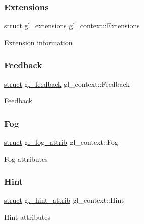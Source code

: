 \subsubsection{\texorpdfstring{Extensions}{Extensions}}
{\footnotesize\ttfamily \hyperlink{interfacestruct}{struct} \hyperlink{structgl__extensions}{gl\+\_\+extensions} gl\+\_\+context\+::\+Extensions}

Extension information \mbox{\label{structgl__context_a95b4746db6881392cca9b3580c0e21a9}} 
\subsubsection{\texorpdfstring{Feedback}{Feedback}}
{\footnotesize\ttfamily \hyperlink{interfacestruct}{struct} \hyperlink{structgl__feedback}{gl\+\_\+feedback} gl\+\_\+context\+::\+Feedback}

Feedback \mbox{\label{structgl__context_af8949f54ba019939b7eebc1200aaec78}} 
\subsubsection{\texorpdfstring{Fog}{Fog}}
{\footnotesize\ttfamily \hyperlink{interfacestruct}{struct} \hyperlink{structgl__fog__attrib}{gl\+\_\+fog\+\_\+attrib} gl\+\_\+context\+::\+Fog}

Fog attributes \mbox{\label{structgl__context_a7ac77ff692912136a0fb6703e1bb863c}} 
\subsubsection{\texorpdfstring{Hint}{Hint}}
{\footnotesize\ttfamily \hyperlink{interfacestruct}{struct} \hyperlink{structgl__hint__attrib}{gl\+\_\+hint\+\_\+attrib} gl\+\_\+context\+::\+Hint}

Hint attributes \mbox{\label{structgl__context_a5f080158d18983d21aa97cc694bdaefb}} 
